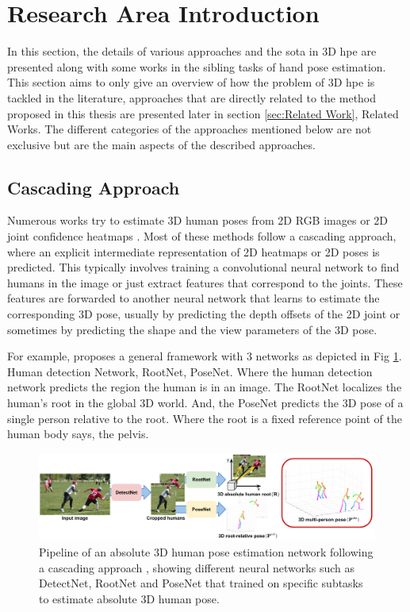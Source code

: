 \section{Research Area Introduction}
\label{sec:Research area introduction}

In this section, the details of various approaches and the \ac{sota} in 3D \ac{hpe} are presented along with some works in the sibling tasks of hand pose estimation. This section aims to only give an overview of how the problem of 3D \ac{hpe} is tackled in the literature, approaches that are directly related to the method proposed in this thesis are presented later in section \ref{sec:Related Work}, Related Works. The different categories of the approaches mentioned below are not exclusive but are the main aspects of the described approaches.

\subsection{Cascading Approach}

Numerous works try to estimate 3D human poses from 2D RGB images or 2D joint confidence heatmaps \cite{CameraDistanceAware, poselifter, DistillNRSfM, occlusionVideo, ordinalranking}. Most of these methods follow a cascading approach, where an explicit intermediate representation of 2D heatmaps or 2D poses is predicted. This typically involves training a convolutional neural network to find humans in the image or just extract features that correspond to the joints. These features are forwarded to another neural network that learns to estimate the corresponding 3D pose, usually by predicting the depth offsets of the 2D joint or sometimes by predicting the shape and the view parameters of the 3D pose.

For example, \cite{CameraDistanceAware} proposes a general framework with 3 networks as depicted in Fig \ref{fig:CameraDistanceAware}. Human detection Network, RootNet, PoseNet. Where the human detection network predicts the region the human is in an image. The RootNet localizes the human's root in the global 3D world. And, the PoseNet predicts the 3D pose of a single person relative to the root. Where the root is a fixed reference point of the human body says, the pelvis.

\begin{figure}[h]
    \centering
    \includegraphics[width=\linewidth]{figures/background/cascading_arch.pdf}
    \caption{Pipeline of an absolute 3D human pose estimation network following a cascading approach \cite{CameraDistanceAware}, showing different neural networks such as DetectNet, RootNet and PoseNet that trained on specific subtasks to estimate absolute 3D human pose.}
    \label{fig:CameraDistanceAware}
\end{figure}

